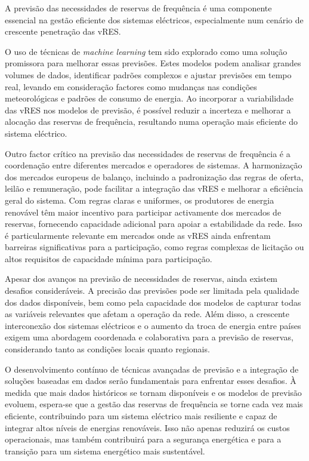 A previsão das necessidades de reservas de frequência é uma componente essencial na gestão eficiente dos sistemas eléctricos, especialmente num cenário de crescente penetração das \gls{vRES}.\par
O uso de técnicas de \textit{machine learning} tem sido explorado como uma solução promissora para melhorar essas previsões. Estes modelos podem analisar grandes volumes de dados, identificar padrões complexos e ajustar previsões em tempo real, levando em consideração factores como mudanças nas condições meteorológicas e padrões de consumo de energia. Ao incorporar a variabilidade das \gls{vRES} nos modelos de previsão, é possível reduzir a incerteza e melhorar a alocação das reservas de frequência, resultando numa operação mais eficiente do sistema eléctrico.\par
Outro factor crítico na previsão das necessidades de reservas de frequência é a coordenação entre diferentes mercados e operadores de sistemas. A harmonização dos mercados europeus de balanço, incluindo a padronização das regras de oferta, leilão e remuneração, pode facilitar a integração das \gls{vRES} e melhorar a eficiência geral do sistema. Com regras claras e uniformes, os produtores de energia renovável têm maior incentivo para participar activamente dos mercados de reservas, fornecendo capacidade adicional para apoiar a estabilidade da rede. Isso é particularmente relevante em mercados onde as \gls{vRES} ainda enfrentam barreiras significativas para a participação, como regras complexas de licitação ou altos requisitos de capacidade mínima para participação.\par
Apesar dos avanços na previsão de necessidades de reservas, ainda existem desafios consideráveis. A precisão das previsões pode ser limitada pela qualidade dos dados disponíveis, bem como pela capacidade dos modelos de capturar todas as variáveis relevantes que afetam a operação da rede. Além disso, a crescente interconexão dos sistemas eléctricos e o aumento da troca de energia entre países exigem uma abordagem coordenada e colaborativa para a previsão de reservas, considerando tanto as condições locais quanto regionais.\par
O desenvolvimento contínuo de técnicas avançadas de previsão e a integração de soluções baseadas em dados serão fundamentais para enfrentar esses desafios. À medida que mais dados históricos se tornam disponíveis e os modelos de previsão evoluem, espera-se que a gestão das reservas de frequência se torne cada vez mais eficiente, contribuindo para um sistema eléctrico mais resiliente e capaz de integrar altos níveis de energias renováveis. Isso não apenas reduzirá os custos operacionais, mas também contribuirá para a segurança energética e para a transição para um sistema energético mais sustentável.\par




\thispagestyle{plain}
